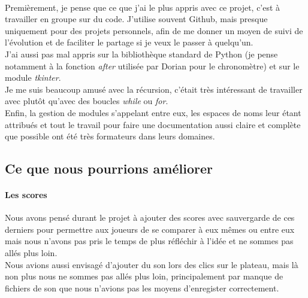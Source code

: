 \documentclass[12pt, a4paper]{article}
\begin{document}
\paragraph{}
Premièrement, je pense que ce que j'ai le plus appris avec ce projet, c'est à
travailler en groupe sur du code. J'utilise souvent Github, mais presque
uniquement pour des projets personnels, afin de me donner un moyen de suivi de
l'évolution et de faciliter le partage si je veux le passer à quelqu'un. \\
J'ai aussi pas mal appris sur la bibliothèque standard de Python (je pense
notamment à la fonction \emph{after} utilisée par Dorian pour le chronomètre)
et sur le module \emph{tkinter}. \\
Je me suis beaucoup amusé avec la récursion, c'était très intéressant de
travailler avec plutôt qu'avec des boucles \emph{while} ou \emph{for}. \\
Enfin, la gestion de modules s'appelant entre eux, les espaces de noms leur
étant attribués et tout le travail pour faire une documentation aussi claire
et complète que possible ont été très formateurs dans leurs domaines.


\subsection{Ce que nous pourrions améliorer}

\paragraph{Les scores}
Nous avons pensé durant le projet à ajouter des scores avec sauvergarde de ces
derniers pour permettre aux joueurs de se comparer à eux mêmes ou entre eux
mais nous n'avons pas pris le temps de plus réfléchir à l'idée et ne sommes pas
allés plus loin. \\
Nous avions aussi envisagé d'ajouter du son lors des clics sur le plateau, mais
là non plus nous ne sommes pas allés plus loin, principalement par manque de
fichiers de son que nous n'avions pas les moyens d'enregister correctement. \\


\end{document}
